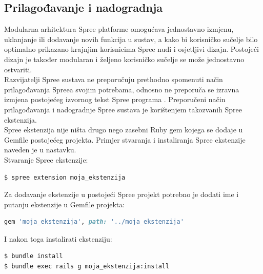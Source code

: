 
\subsection{Prilagođavanje i nadogradnja}

Modularna arhitektura Spree platforme omogućava jednostavno izmjenu, uklanjanje ili dodavanje novih funkcija u sustav, a kako bi korisničko sučelje bilo optimalno prikazano krajnjim korisnicima Spree nudi i osjetljivi dizajn. 
Postojeći dizajn je također modularan i željeno korisničko sučelje se može jednostavno ostvariti.
\\
Razvijatelji Spree sustava ne preporučuju prethodno spomenuti način prilagođavanja Spreea svojim potrebama, odnosno ne preporuča se izravna izmjena postojećeg izvornog tekst Spree programa \citep{spreeExt}. 
Preporučeni način prilagođavanja i nadogradnje Spree sustava je korištenjem takozvanih Spree ekstenzija.
\\
Spree ekstenzija nije ništa drugo nego zasebni Ruby gem kojega se dodaje u Gemfile postojećeg projekta. 
Primjer stvaranja i instaliranja Spree ekstenzije naveden je u nastavku.
\\

Stvaranje Spree ekstenzije:
\begin{lstlisting}[language=bash]
$ spree extension moja_ekstenzija
\end{lstlisting}

Za dodavanje ekstenzije u postojeći Spree projekt potrebno je dodati ime i putanju ekstenzije u Gemfile projekta:
\begin{lstlisting}[language=ruby]
gem 'moja_ekstenzija', path: '../moja_ekstenzija'
\end{lstlisting}

I nakon toga instalirati ekstenziju:
\begin{lstlisting}[language=bash]
$ bundle install
$ bundle exec rails g moja_ekstenzija:install
\end{lstlisting}

